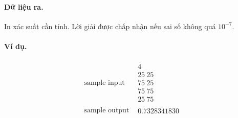 \documentclass[11pt]{article}
\begin{document}
\paragraph{Dữ liệu ra.}
In xác suất cần tính. Lời giải được chấp nhận nếu sai số không quá \(10^{-7}\).

\paragraph{Ví dụ.}
\[
\begin{array}{rl}
\text{sample input} &
\begin{array}{l}
4\\
25\ 25\\
75\ 25\\
75\ 75\\
25\ 75
\end{array}
\\[1em]
\text{sample output} &
\begin{array}{l}
0.7328341830
\end{array}
\end{array}
\]
\end{document}
